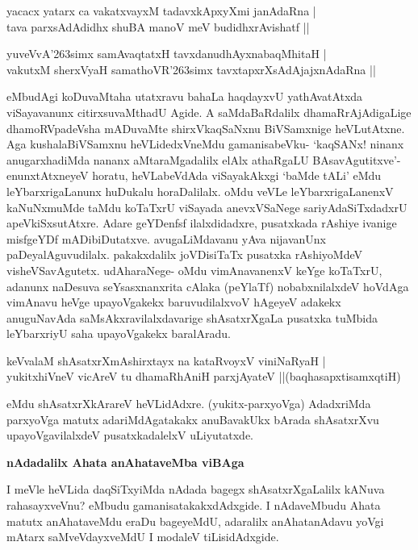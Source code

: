 \begin{shloka}
yacacx yatarx ca vakatxvayxM tadavxkApxyXmi janAdaRna |\\
tava parxsAdAdidhx shuBA manoV meV budidhxrAvishatf ||
\end{shloka}

\begin{shloka}
yuveVvA\char'263simx samAvaqtatxH tavxdanudhAyxnabaqMhitaH |\\
vakutxM sherxVyaH samathoVR\char'263simx tavxtapxrXsAdAjajxnAdaRna ||
\end{shloka}

\noindent
eMbudAgi koDuvaMtaha utatxravu bahaLa haqdayxvU yathAvatAtxda viSayavanunx citirxsu\-vaMthadU Agide. A saMdaBaRdalilx dhamaRrAjAdigaLige dhamoRVpadeVsha mADuvaMte shirxVkaqSaNxnu BiVSamxnige heVLutAtxne. Aga kushalaBiVSamxnu heVLidedxVneMdu gamanisa\-beVku- `kaqSANx! ninanx anugarxhadiMda nananx aMtaraMgadalilx elAlx athaRgaLU BAsavAgutitxve'- enunxtAtxneyeV horatu, heVLabeVdAda viSayakAkxgi `baMde tALi' eMdu leYbarxrigaLanunx huDukalu horaDalilalx. oMdu veVLe leYbarxrigaLanenxV kaNuNx\-muMde taMdu koTaTxrU viSayada anevxVSaNege sariyAdaSiTxdadxrU apeVkiSxsutAtxre. Adare geYDenfsf ilalxdidadxre, pusatxkada rAshi\-ye ivanige misfgeYDf mADibiDutatxve. avugaLiMdavanu yAva nijavanUnx paDeyalAguvudilalx. pakakx\-dalilx joVDisiTaTx pusatxka rAshiyoMdeV visheVSavAgutetx. udAharaNege- oMdu vimAnavanenxV keYge koTaTxrU, adanunx naDesuva seYsasxnanxrita cAlaka (peYlaTf) nobabxnilalxdeV hoVdAga vimAnavu heVge upa\-yoVgakekx baruvudilalxvoV hAgeyeV adakekx anuguNavAda saMsAkxravilalxdavarige shAsatxrXgaLa pusatxka tuMbida leYbarxriyU saha upayoVgakekx bara\-lAradu.

\begin{shloka}
keVvalaM shAsatxrXmAshirxtayx na kataRvoyxV viniNaRyaH |\\\label{164}
yukitxhiVneV vicAreV tu dhamaRhAniH parxjAyateV ||\hfill{(baqhasapxtisamxqtiH)}
\end{shloka}

\noindent
eMdu shAsatxrXkArareV heVLidAdxre. (yukitx-parxyoVga) AdadxriMda parxyoVga matutx adariMdAgatakakx anuBavakUkx bArada shAsatxrXvu upayoVgavilalxdeV pusatxkadalelxV uLiyutatxde.

\eject

{\bigskip
\noindent
{\large\bf nAdadalilx Ahata anAhataveMba viBAga}}\label{page164}
\medskip

\noindent
I meVle heVLida daqSiTxyiMda nAdada bagegx shAsatxrXgaLalilx kANuva rahasayxveVnu? eMbudu gama\-nisa\-takakxdAdxgide. I nAdaveMbudu Ahata matutx anAhataveMdu eraDu bageyeMdU, adaralilx anA\-hata\-nAdavu yoVgi mAtarx saMveVdayxveMdU I modaleV tiLisidAdxgide.


